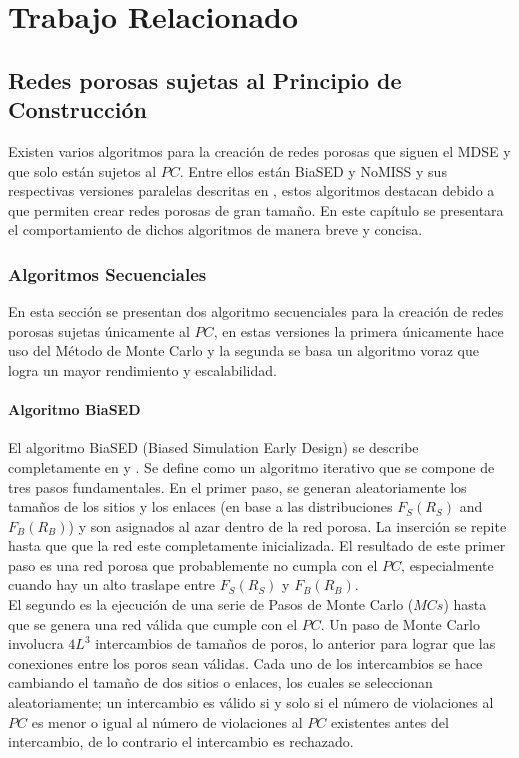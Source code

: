 \chapter{Trabajo Relacionado}
\label{champ:relatedwork}
\bigskip
\barra
\bigskip

\section{Redes porosas sujetas al Principio de Construcción}
Existen varios algoritmos para la creación de redes porosas que siguen el MDSE y que solo están sujetos al $PC$. Entre ellos están BiaSED\cite{ref1} y NoMISS\cite{ref3} y sus respectivas versiones paralelas descritas en \cite{ref4}, estos algoritmos destacan debido a que permiten crear redes porosas de gran tamaño. En este capítulo se presentara el comportamiento de dichos algoritmos de manera breve y concisa.\\

\subsection{Algoritmos Secuenciales}
\label{subsec:seqversions}
En esta sección se presentan dos algoritmo secuenciales para la creación de redes porosas sujetas únicamente al $PC$, en estas versiones la primera únicamente hace uso del Método de Monte Carlo \cite{ref15} y la segunda se basa un algoritmo voraz que logra un mayor rendimiento y escalabilidad.\\

\subsubsection{Algoritmo BiaSED}
\label{subsubsec:biased}
El algoritmo BiaSED (Biased Simulation Early Design) se describe completamente en \cite{ref1} y \cite{ref4}. Se define como un algoritmo iterativo que se compone de tres pasos fundamentales. En el primer paso, se generan aleatoriamente los tamaños de los sitios y los enlaces (en base a las distribuciones $F_S(R_S)$ and $F_B(R_B)$) y son asignados al azar dentro de la red porosa. La inserción se repite hasta que que la red este completamente inicializada. El resultado de este primer paso es una red porosa que probablemente no cumpla con el $PC$, especialmente cuando hay un alto traslape entre $F_S(R_S)$ y $F_B(R_B)$.\\

El segundo es la ejecución de una serie de Pasos de Monte Carlo ($MCs$) hasta que se genera una red válida que cumple con el $PC$. Un paso de Monte Carlo involucra $4L^3$ intercambios de tamaños de poros, lo anterior para lograr que las conexiones entre los poros sean válidas. Cada uno de los intercambios se hace cambiando el tamaño de dos sitios o enlaces, los cuales se seleccionan aleatoriamente; un intercambio es válido si y solo si el número de violaciones al $PC$ es menor o igual al número de violaciones al $PC$ existentes antes del intercambio, de lo contrario el intercambio es rechazado.\\

